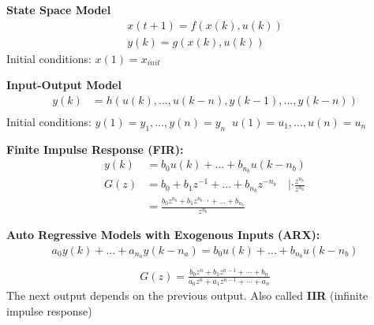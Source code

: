 \begin{tcolorbox}[colback=green!5!white,colframe=green!75!black,title=\textbf{Deterministic Model}]
	\textbf{State Space Model}
	\begin{align*}
	x(t+1) = f(x(k), u(k))\\
	y(k) = g(x(k), u(k))
	\end{align*}
	Initial conditions: $x(1) = x_{init}$
	
	\textbf{Input-Output Model}
	\begin{align*}
	y(k) &= h(u(k), ..., u(k-n), y(k-1), ..., y(k-n))\\
	\end{align*}
	Initial conditions: $y(1) = y_1,\dots,y(n) = y_n  \;\; u(1)= u_1,\dots,u(n) = u_n$
	
	
	\textbf{Finite Impulse Response (FIR): } 
	\begin{align*}
		y(k) &= b_0 u(k) + ... + b_{n_b} u(k-n_b) \\
		G(z) &= b_0 + b_1z^{-1} + ... + b_{n_b}z^{-n_b} \quad | \cdot \frac{z^{n_b}}{z^{n_b}} \\
		&= \frac{b_0 z^{n_b} + b_1 z^{ n_{b-1} } + ... + b_{n_b} }{z^{n_b}}
	\end{align*}
	
	\textbf{Auto Regressive Models with Exogenous Inputs (ARX): }
	\begin{align*}
		a_0y(k)+\dots+a_{n_a}y(k-n_a) = b_0u(k) + \dots+b_{n_b}u(k-n_b)\\
	\end{align*}
	\begin{align*}
	G(z) = \frac{b_0z^n + b_1z^{n-1} + \cdots + b_n}{a_0z^n + a_1z^{n-1} + \cdots + a_n}
	\end{align*}
	The next output depends on the previous output. Also called \textbf{IIR} (infinite impulse response)
	
\end{tcolorbox}		

